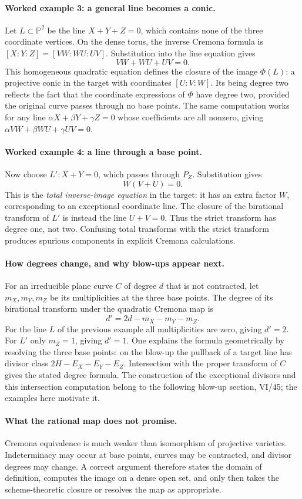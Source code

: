 \paragraph{Worked example 3: a general line becomes a conic.}
Let $L\subset\mathbb P^2$ be the line $X+Y+Z=0$, which
contains none of the three coordinate vertices.  On the dense
torus, the inverse Cremona formula is
$[X:Y:Z]=[VW:WU:UV]$.  Substitution into the line equation
gives
\[
 VW+WU+UV=0.
\]
This homogeneous quadratic equation defines the closure of
the image $\Phi(L)$: a projective conic in the target with
coordinates $[U:V:W]$.  Its being degree two reflects the
fact that the coordinate expressions of $\Phi$ have degree
two, provided the original curve passes through no base points.
The same computation works for any line
$\alpha X+\beta Y+\gamma Z=0$ whose coefficients are all
nonzero, giving $\alpha VW+\beta WU+\gamma UV=0$.

\paragraph{Worked example 4: a line through a base point.}
Now choose $L':X+Y=0$, which passes through $P_Z$.
Substitution gives
\[
 W(V+U)=0.
\]
This is the \emph{total inverse-image equation} in the target:
it has an extra factor $W$, corresponding to an exceptional
coordinate line.  The closure of the birational transform of
$L'$ is instead the line $U+V=0$.  Thus the strict transform
has degree one, not two.  Confusing total transforms with the
strict transform produces spurious components in explicit
Cremona calculations.

\paragraph{How degrees change, and why blow-ups appear next.}
For an irreducible plane curve $C$ of degree $d$ that is not
contracted, let $m_X,m_Y,m_Z$ be its multiplicities at the
three base points.  The degree of its birational transform under
the quadratic Cremona map is
\[
 d'=2d-m_X-m_Y-m_Z.
\]
For the line $L$ of the previous example all multiplicities
are zero, giving $d'=2$.  For $L'$ only $m_Z=1$, giving
$d'=1$.  One explains the formula geometrically by resolving
the three base points: on the blow-up the pullback of a target
line has divisor class $2H-E_X-E_Y-E_Z$.  Intersection with
the proper transform of $C$ gives the stated degree formula.
The construction of the exceptional divisors and this
intersection computation belong to the following blow-up
section, VI/45; the examples here motivate it.

\paragraph{What the rational map does not promise.}
Cremona equivalence is much weaker than isomorphism of
projective varieties.  Indeterminacy may occur at base points,
curves may be contracted, and divisor degrees may change.
A correct argument therefore states the domain of definition,
computes the image on a dense open set, and only then takes the
scheme-theoretic closure or resolves the map as appropriate.
